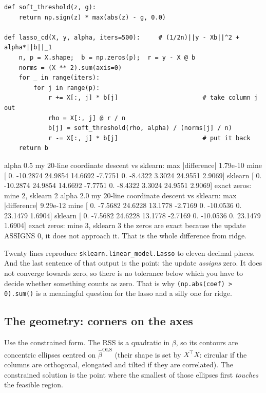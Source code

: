 \documentclass[11pt]{article}
\newcommand{\bhat}{\hat\beta}
\newcommand{\XtX}{X^{\!\top}\!X}
\begin{document}
\begin{lstlisting}
def soft_threshold(z, g):
    return np.sign(z) * max(abs(z) - g, 0.0)

def lasso_cd(X, y, alpha, iters=500):     # (1/2n)||y - Xb||^2 + alpha*||b||_1
    n, p = X.shape;  b = np.zeros(p);  r = y - X @ b
    norms = (X ** 2).sum(axis=0)
    for _ in range(iters):
        for j in range(p):
            r += X[:, j] * b[j]                       # take column j out
            rho = X[:, j] @ r / n
            b[j] = soft_threshold(rho, alpha) / (norms[j] / n)
            r -= X[:, j] * b[j]                       # put it back
    return b
\end{lstlisting}
\begin{codeout}
  alpha 0.5  my 20-line coordinate descent vs sklearn:  max |difference| 1.79e-10
     mine    [ 0.     -10.2874  24.9854  14.6692  -7.7751  0.      -8.4322   3.3024  24.9551   2.9069]
     sklearn [ 0.     -10.2874  24.9854  14.6692  -7.7751  0.      -8.4322   3.3024  24.9551   2.9069]
     exact zeros: mine 2, sklearn 2
  alpha 2.0  my 20-line coordinate descent vs sklearn:  max |difference| 9.29e-12
     mine    [ 0.      -7.5682  24.6228  13.1778  -2.7169  0.     -10.0536   0.      23.1479   1.6904]
     sklearn [ 0.      -7.5682  24.6228  13.1778  -2.7169  0.     -10.0536   0.      23.1479   1.6904]
     exact zeros: mine 3, sklearn 3
  the zeros are exact because the update ASSIGNS 0, it does not
  approach it. That is the whole difference from ridge.
\end{codeout}

Twenty lines reproduce \texttt{sklearn.linear\_model.Lasso} to eleven decimal
places. And the last sentence of that output is the point: the update
\emph{assigns} zero. It does not converge towards zero, so there is no
tolerance below which you have to decide whether something counts as zero.
That is why \texttt{(np.abs(coef) > 0).sum()} is a meaningful question for the
lasso and a silly one for ridge.

\subsection{The geometry: corners on the axes}
\label{sec:geometry}

Use the constrained form. The RSS is a quadratic in $\beta$, so its contours
are concentric ellipses centred on $\bhat^{\mathrm{OLS}}$ (their shape is set
by $\XtX$: circular if the columns are orthogonal, elongated and tilted if
they are correlated). The constrained solution is the point where the smallest
of those ellipses first \emph{touches} the feasible region.
\end{document}
